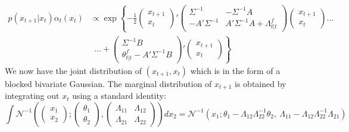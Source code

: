 \documentclass{article} %
\begin{document}
\begin{align*}
p(x_{t+1}|x_t)\alpha_t(x_t)&\propto \exp\left\{-\frac{1}{2}\begin{pmatrix}x_{t+1}\\x_t\end{pmatrix}'
    \begin{pmatrix}\Sigma^{-1} & -\Sigma^{-1}A\\
    -A'\Sigma^{-1} & A'\Sigma^{-1}A + \Lambda^f_{t|t}\end{pmatrix}\begin{pmatrix}x_{t+1}\\x_t\end{pmatrix}\right. \ldots\\
    &~~\ldots+ \left. \begin{pmatrix}\Sigma^{-1}B\\ \theta^f_{t|t}-A'\Sigma^{-1}B\end{pmatrix}'\begin{pmatrix}x_{t+1}\\x_t\end{pmatrix}\right\}
\end{align*}
We now have the joint distribution of $(x_{t+1},x_t)$ which is in the form of a blocked bivariate Gaussian. The marginal distribution of $x_{t+1}$ is obtained by integrating out $x_t$ using a standard identity:
\[\int\mathcal{N}^{-1}\left(\begin{pmatrix}x_1\\ x_2\end{pmatrix} ; \begin{pmatrix}\theta_1\\ \theta_2\end{pmatrix}, \begin{pmatrix}\Lambda_{11} & \Lambda_{12} \\ \Lambda_{21}& \Lambda_{22}\end{pmatrix}\right)dx_2 = \mathcal{N}^{-1}(x_1;\theta_1-\Lambda_{12}\Lambda_{22}^{-1}\theta_2, ~ \Lambda_{11} - \Lambda_{12}\Lambda_{22}^{-1}\Lambda_{21})\]
\end{document}
